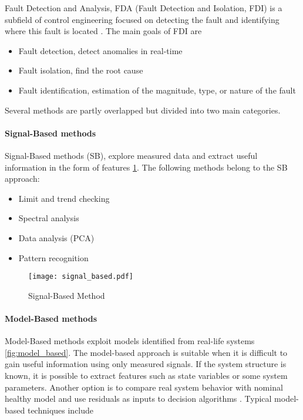 Fault Detection and Analysis, FDA (Fault Detection and Isolation, FDI) is a
subfield of control engineering focused on detecting the fault and
identifying where this fault is located \cite{fdi_cern2}. 
The main goals of FDI are
\begin{itemize}
    \item Fault detection, detect anomalies in real-time
    \item Fault isolation, find the root cause
    \item Fault identification, estimation of the magnitude, type, or nature of
        the fault 
\end{itemize}

Several methods are partly overlapped but divided into two main
categories. 

\paragraph{Signal-Based methods} Signal-Based methods (SB), explore measured
data and extract useful information in the form of features
\ref{fig:signal_based}. The following methods belong to the SB approach: 

\begin{itemize}
    \item Limit and trend checking
    \item Spectral analysis
    \item Data analysis (PCA)
    \item Pattern recognition
\end{itemize}

\begin{figure}[h!]
    \centering
    \texttt{[image: signal\_based.pdf]}
    \caption{Signal-Based Method}
    \label{fig:signal_based}
\end{figure}


\paragraph{Model-Based methods} Model-Based methods exploit models identified
from real-life systems \ref{fig:model_based}. The model-based approach is
suitable when it is difficult to gain useful information using only
measured signals. If the system structure is known, it is possible to
extract features such as state variables or some system parameters.
Another option is to compare real system behavior with nominal healthy
model and use residuals as inputs to decision algorithms \cite{matlab_full}.
Typical model-based techniques include

